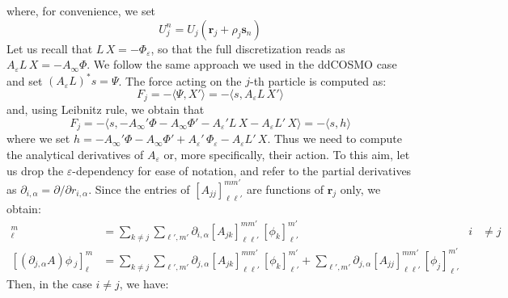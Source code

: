 \documentclass[12pt,letterpaper,oneside]{article}
\theoremstyle{definition}
\begin{document}
where, for convenience, we set
\[
U_j^n = U_j(\boldsymbol{r}_j + \rho_j\boldsymbol{s}_n)
\]
Let us recall that $L\,X = -\Phi_\varepsilon$, so that the full discretization reads as $A_\varepsilon L \, X = - A_\infty \Phi$. We follow the same approach we used in the ddCOSMO case and set $(A_\varepsilon L)^* s = \Psi$. The force acting on the $j$-th particle is computed as:
\[
F_j = - \langle \Psi, X'\rangle = - \langle s , A_\varepsilon L \, X' \rangle
\]
and, using Leibnitz rule, we obtain that
\[
F_j = - \langle s , - A_\infty' \Phi - A_\infty \Phi' - A_\varepsilon' L \, X - A_\varepsilon L' \, X  \rangle = - \langle s , h \rangle
\]
where we set $h = -A_\infty' \Phi - A_\infty \Phi' + A_\varepsilon' \, \Phi_\varepsilon - A_\varepsilon L' \, X$. Thus we need to compute the analytical derivatives of $A_\varepsilon$ or, more specifically, their action. To this aim, let us drop the $\varepsilon$-dependency for ease of notation, and refer to the partial derivatives as $\partial_{i,\alpha} = \partial/\partial r_{i,\alpha}$.
Since the entries of ${[A_{jj}]}_{\ell \ell'}^{mm'}$ are functions of $\boldsymbol{r}_j$ only, we obtain:
\begin{align*}
[(\partial_{i,\alpha} A) \phi \,_j]_\ell^m & = \sum_{k\ne j} \sum_{\ell',m'} \partial_{i,\alpha}[A_{jk}]_{\ell \ell'}^{m m'} \, [\phi_k]_{\ell'}^{m'}  & i  &\ne j \\
[(\partial_{j,\alpha} A) \phi \,_j]_\ell^m & = \sum_{k\ne j} \sum_{\ell',m'} \partial_{j,\alpha}[A_{jk}]_{\ell \ell'}^{m m'} \, [\phi_k]_{\ell'}^{m'} + \sum_{\ell',m'} \partial_{j,\alpha} [A_{jj}]_{\ell \ell'}^{m m'} \, [\phi_j]_{\ell'}^{m'} & &
\end{align*}
Then, in the case $i\ne j$, we have:
\end{document}
